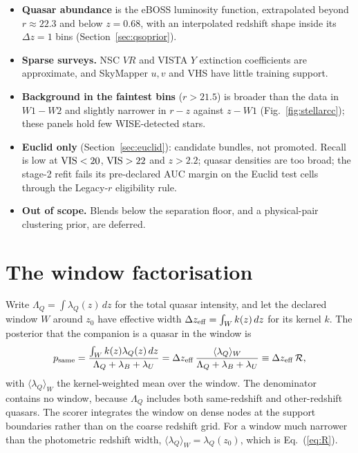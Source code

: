 \documentclass[11pt,a4paper]{article}
\newcommand{\R}{\mathcal{R}}
\begin{document}
\begin{itemize}
\item \textbf{Quasar abundance} is the eBOSS luminosity function, extrapolated beyond $r\approx22.3$ and below
  $z=0.68$, with an interpolated redshift shape inside its $\Delta z=1$ bins (Section~\ref{sec:qsoprior}).
\item \textbf{Sparse surveys.} NSC $VR$ and VISTA $Y$ extinction coefficients are approximate, and
  SkyMapper $u,v$ and VHS have little training support.
\item \textbf{Background in the faintest bins} ($r>21.5$) is broader than the data in $W1-W2$ and slightly
  narrower in $r-z$ against $z-W1$ (Fig.~\ref{fig:stellarcc}); these panels hold few WISE-detected stars.

\item \textbf{Euclid only} (Section~\ref{sec:euclid}): candidate bundles, not promoted. Recall is low at
  ${\rm VIS}<20$, ${\rm VIS}>22$ and $z>2.2$; quasar densities are too broad; the stage-2 refit fails its
  pre-declared AUC margin on the Euclid test cells through the Legacy-$r$ eligibility rule.

\item \textbf{Out of scope.} Blends below the separation floor, and a physical-pair clustering prior,
  are deferred.
\end{itemize}

\appendix
\section{The window factorisation}\label{app:window}
Write $\Lambda_Q=\int\lambda_Q(z)\,dz$ for the total quasar intensity, and let the declared window $W$
around $z_0$ have effective width $\Delta z_{\rm eff}=\int_Wk(z)\,dz$ for its kernel $k$. The posterior
that the companion is a quasar in the window is
\begin{equation}
p_{\rm same}=\frac{\int_Wk(z)\lambda_Q(z)\,dz}{\Lambda_Q+\lambda_B+\lambda_U}
=\Delta z_{\rm eff}\,\frac{\langle\lambda_Q\rangle_W}{\Lambda_Q+\lambda_B+\lambda_U}\equiv\Delta z_{\rm eff}\,\R,
\end{equation}
with $\langle\lambda_Q\rangle_W$ the kernel-weighted mean over the window. The denominator contains no
window, because $\Lambda_Q$ includes both same-redshift and other-redshift quasars. The scorer integrates
the window on dense nodes at the support boundaries rather than on the coarse redshift grid. For a
window much narrower than the photometric redshift width, $\langle\lambda_Q\rangle_W=\lambda_Q(z_0)$,
which is Eq.~(\ref{eq:R}).
\end{document}

